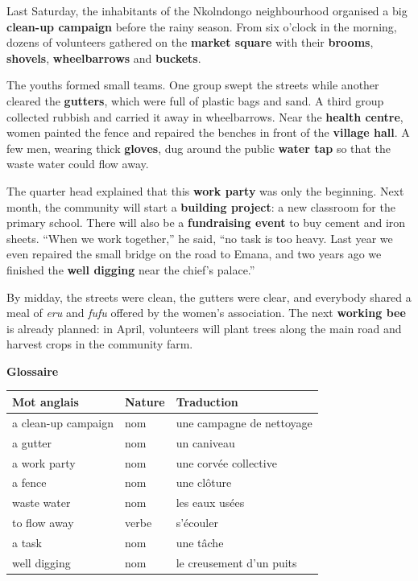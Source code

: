 \documentclass[11pt]{article}
\begin{document}
\begin{textebox}
Last Saturday, the inhabitants of the Nkolndongo neighbourhood organised a big \textbf{clean-up campaign} before the rainy season. From six o'clock in the morning, dozens of volunteers gathered on the \textbf{market square} with their \textbf{brooms}, \textbf{shovels}, \textbf{wheelbarrows} and \textbf{buckets}.

The youths formed small teams. One group swept the streets while another cleared the \textbf{gutters}, which were full of plastic bags and sand. A third group collected rubbish and carried it away in wheelbarrows. Near the \textbf{health centre}, women painted the fence and repaired the benches in front of the \textbf{village hall}. A few men, wearing thick \textbf{gloves}, dug around the public \textbf{water tap} so that the waste water could flow away.

The quarter head explained that this \textbf{work party} was only the beginning. Next month, the community will start a \textbf{building project}: a new classroom for the primary school. There will also be a \textbf{fundraising event} to buy cement and iron sheets. “When we work together,” he said, “no task is too heavy. Last year we even repaired the small bridge on the road to Emana, and two years ago we finished the \textbf{well digging} near the chief's palace.”

By midday, the streets were clean, the gutters were clear, and everybody shared a meal of \emph{eru} and \emph{fufu} offered by the women's association. The next \textbf{working bee} is already planned: in April, volunteers will plant trees along the main road and harvest crops in the community farm.
\end{textebox}

\textbf{Glossaire}

\begin{center}
\begin{tabularx}{\linewidth}{|l|l|X|}\hline
\rowcolor{popblueL} \textbf{Mot anglais} & \textbf{Nature} & \textbf{Traduction} \\ \hline
a clean-up campaign & nom & une campagne de nettoyage \\ \hline
a gutter & nom & un caniveau \\ \hline
a work party & nom & une corvée collective \\ \hline
a fence & nom & une clôture \\ \hline
waste water & nom & les eaux usées \\ \hline
to flow away & verbe & s'écouler \\ \hline
a task & nom & une tâche \\ \hline
well digging & nom & le creusement d'un puits \\ \hline
\end{tabularx}
\end{center}
\end{document}
